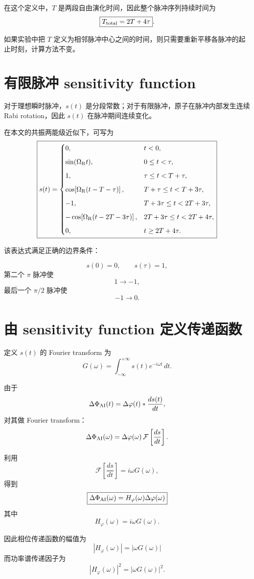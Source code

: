 \documentclass[UTF8,12pt,a4paper,fontset=fandol]{ctexart}
\begin{document}
在这个定义中，$T$ 是两段自由演化时间，因此整个脉冲序列持续时间为
\[
\boxed{
T_{\rm total}=2T+4\tau
}.
\]

如果实验中把 $T$ 定义为相邻脉冲中心之间的时间，则只需要重新平移各脉冲的起止时刻，计算方法不变。

\section{有限脉冲 sensitivity function}

对于理想瞬时脉冲，$s(t)$ 是分段常数；对于有限脉冲，原子在脉冲内部发生连续 Rabi rotation，因此 $s(t)$ 在脉冲期间连续变化。

在本文的共振两能级近似下，可写为
\[
\boxed{
s(t)=
\begin{cases}
0,
&t<0,
\\[2mm]
\sin(\Omega_{\rm R}t),
&0\le t<\tau,
\\[2mm]
1,
&\tau\le t<T+\tau,
\\[2mm]
\cos\!\left[\Omega_{\rm R}(t-T-\tau)\right],
&T+\tau\le t<T+3\tau,
\\[2mm]
-1,
&T+3\tau\le t<2T+3\tau,
\\[2mm]
-\cos\!\left[\Omega_{\rm R}(t-2T-3\tau)\right],
&2T+3\tau\le t<2T+4\tau,
\\[2mm]
0,
&t\ge 2T+4\tau.
\end{cases}
}
\]

该表达式满足正确的边界条件：

\[
s(0)=0,
\qquad
s(\tau)=1,
\]
第二个 $\pi$ 脉冲使
\[
1\rightarrow -1,
\]
最后一个 $\pi/2$ 脉冲使
\[
-1\rightarrow 0.
\]

\section{由 sensitivity function 定义传递函数}

定义 $s(t)$ 的 Fourier transform 为
\[
\boxed{
G(\omega)
=
\int_{-\infty}^{+\infty}
s(t)e^{-i\omega t}\,dt
}.
\]

由于
\[
\Delta\Phi_{\rm AI}(t)
=
\Delta\varphi(t)*\frac{ds(t)}{dt},
\]
对其做 Fourier transform：
\[
\Delta\Phi_{\rm AI}(\omega)
=
\Delta\varphi(\omega)\,
\mathcal{F}
\left[
\frac{ds}{dt}
\right].
\]

利用
\[
\mathcal{F}
\left[
\frac{ds}{dt}
\right]
=
i\omega G(\omega),
\]
得到
\[
\boxed{
\Delta\Phi_{\rm AI}(\omega)
=
H_\varphi(\omega)
\Delta\varphi(\omega)
}
\]
其中
\[
\boxed{
H_\varphi(\omega)
=
i\omega G(\omega)
}.
\]

因此相位传递函数的幅值为
\[
\boxed{
|H_\varphi(\omega)|
=
|\omega G(\omega)|
}
\]
而功率谱传递因子为
\[
\boxed{
|H_\varphi(\omega)|^2
=
|\omega G(\omega)|^2
}.
\]
\end{document}
